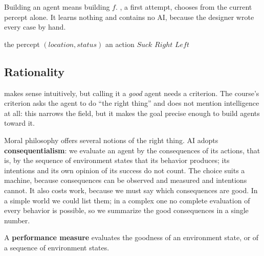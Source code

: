 Building an agent means building $f$. , a first
attempt, chooses from the current percept alone. It learns nothing and contains
no AI, because the designer wrote every case by hand.

\begin{algorithm}[htbp]
  \caption{Reflex vacuum agent}\label{alg:reflex-vacuum}
  \begin{algorithmic}[1]
    \Require the percept $(\mathit{location}, \mathit{status})$
    \Ensure an action
        \State \Return $\mathit{Suck}$
        \State \Return $\mathit{Right}$
        \State \Return $\mathit{Left}$
      \EndIf
    \EndFunction
  \end{algorithmic}
\end{algorithm}

\subsection{Rationality}\label{sec:agents-rationality}

 makes sense intuitively, but calling it a \emph{good}
agent needs a criterion. The course's criterion asks the agent to do ``the
right thing'' and does not mention intelligence at all: this narrows the field,
but it makes the goal precise enough to build agents toward it.

Moral philosophy offers several notions of the right thing. AI adopts
\textbf{consequentialism}: we evaluate an agent by the consequences of its
actions, that is, by the sequence of environment states that its behavior
produces; its intentions and its own opinion of its success do not count. The
choice suits a machine, because consequences can be observed and measured and
intentions cannot. It also costs work, because we must say which consequences
are good. In a simple world we could list them; in a complex one no complete
evaluation of every behavior is possible, so we summarize the good
consequences in a single number.

\begin{definition}\label{def:performance-measure}
  A \textbf{performance measure} evaluates the goodness of an environment state,
  or of a sequence of environment states.
\end{definition}

